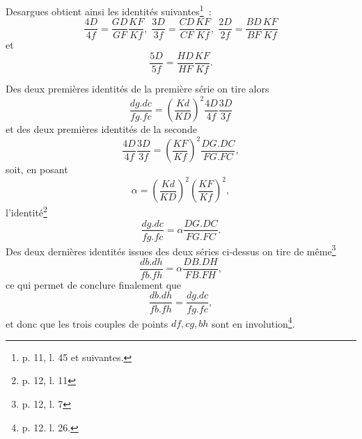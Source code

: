 \documentclass[12pt, a4paper]{article}
\begin{document}

Desargues obtient ainsi les identités suivantes\footnote{p. 11, l. 45 et suivantes.}~:~
\[
\frac{4D}{4f}=\frac{GD}{GF}\frac{KF}{Kf},\;\frac{3D}{3f}=\frac{CD}{CF}\frac{KF}{Kf},\;\frac{2D}{2f}=\frac{BD}{BF}\frac{KF}{Kf}
\]
et
\[
\frac{5D}{5f}=\frac{HD}{HF}\frac{KF}{Kf}.
\]


Des deux premières identités de la première série on tire alors
\[
\frac{dg.dc}{fg.fc}=\left(\frac{Kd}{KD}\right)^2\frac{4D}{4f}\frac{3D}{3f}
\]
et des deux premières identités de la seconde
\[
\frac{4D}{4f}\frac{3D}{3f}=\left(\frac{KF}{Kf}\right)^2\frac{DG.DC}{FG.FC},
\]
soit, en posant
\[
\alpha=\left(\frac{Kd}{KD}\right)^2\left(\frac{KF}{Kf}\right)^2,
\]
l'identité\footnote{p. 12, l. 11}
\[
\frac{dg.dc}{fg.fc}=\alpha \frac{DG.DC}{FG.FC}.
\]
Des deux dernières identités issues des deux séries ci-dessus on tire de même\footnote{p. 12, l. 7}
\[
\frac{db.dh}{fb.fh}=\alpha\frac{DB.DH}{FB.FH},
\]
ce qui permet de conclure finalement que
\[
\frac{db.dh}{fb.fh}=\frac{dg.dc}{fg.fc},
\]
et donc que les trois couples de points $df, cg, bh$ sont en involution\footnote{p. 12. l. 26.}.
\end{document}
